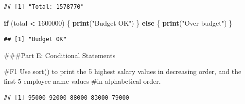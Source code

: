 \documentclass[
]{article}
\newenvironment{Shaded}{\begin{snugshade}}{\end{snugshade}}
\newcommand{\AttributeTok}[1]{\textcolor[rgb]{0.13,0.29,0.53}{#1}}
\newcommand{\ConstantTok}[1]{\textcolor[rgb]{0.56,0.35,0.01}{#1}}
\newcommand{\ControlFlowTok}[1]{\textcolor[rgb]{0.13,0.29,0.53}{\textbf{#1}}}
\newcommand{\DecValTok}[1]{\textcolor[rgb]{0.00,0.00,0.81}{#1}}
\newcommand{\FunctionTok}[1]{\textcolor[rgb]{0.13,0.29,0.53}{\textbf{#1}}}
\newcommand{\NormalTok}[1]{#1}
\newcommand{\OtherTok}[1]{\textcolor[rgb]{0.56,0.35,0.01}{#1}}
\newcommand{\SpecialCharTok}[1]{\textcolor[rgb]{0.81,0.36,0.00}{\textbf{#1}}}
\newcommand{\StringTok}[1]{\textcolor[rgb]{0.31,0.60,0.02}{#1}}
\begin{document}
\begin{Shaded}
\end{Shaded}

\begin{verbatim}
## [1] "Total: 1578770"
\end{verbatim}

\begin{Shaded}
\begin{Highlighting}[]
\ControlFlowTok{if}\NormalTok{ (total }\SpecialCharTok{\textless{}} \DecValTok{1600000}\NormalTok{) \{}
  \FunctionTok{print}\NormalTok{(}\StringTok{"Budget OK"}\NormalTok{)}
\NormalTok{\} }\ControlFlowTok{else}\NormalTok{ \{}
  \FunctionTok{print}\NormalTok{(}\StringTok{"Over budget"}\NormalTok{)}
\NormalTok{\}}
\end{Highlighting}
\end{Shaded}

\begin{verbatim}
## [1] "Budget OK"
\end{verbatim}

\#\#\#Part E: Conditional Statements

\#F1 Use sort() to print the 5 highest salary values in decreasing
order, and the first 5 employee name values \#in alphabetical order.

\begin{Shaded}
\end{Shaded}

\begin{verbatim}
## [1] 95000 92000 88000 83000 79000
\end{verbatim}

\begin{Shaded}
\end{Shaded}
\end{document}
